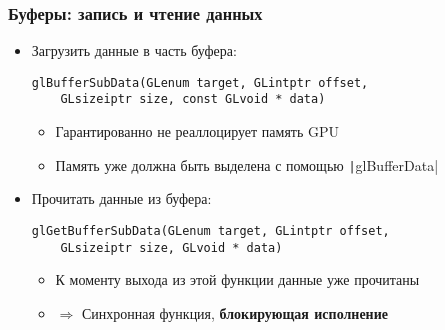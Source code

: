 \documentclass[10pt]{beamer}
\begin{document}
\begin{frame}[fragile]
\frametitle{Буферы: запись и чтение данных}
\begin{itemize}
\item Загрузить данные в часть буфера:
\begin{verbatim}
glBufferSubData(GLenum target, GLintptr offset,
    GLsizeiptr size, const GLvoid * data)
\end{verbatim}
\vspace*{-0.5cm}
\pause
{}
\begin{itemize}
\item Гарантированно не реаллоцирует память GPU
\item Память уже должна быть выделена с помощью \texttt|glBufferData|
\end{itemize}
\pause
\item Прочитать данные из буфера:
\begin{verbatim}
glGetBufferSubData(GLenum target, GLintptr offset,
    GLsizeiptr size, GLvoid * data)
\end{verbatim}
\vspace*{-0.5cm}
\pause
\begin{itemize}
\item К моменту выхода из этой функции данные уже прочитаны
\item \begin{math}\Rightarrow\end{math} Синхронная функция, \textbf{блокирующая исполнение}
\end{itemize}
\end{itemize}
\end{frame}
\end{document}
